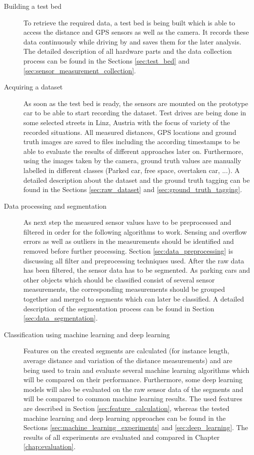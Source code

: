 \begin{description}

\item[Building a test bed] To retrieve the required data, a test bed is being built which is able to access the distance and GPS sensors as well as the camera. It records these data continuously while driving by and saves them for the later analysis. The detailed description of all hardware parts and the data collection process can be found in the Sections \ref{sec:test_bed} and \ref{sec:sensor_measurement_collection}.

\item[Acquiring a dataset] As soon as the test bed is ready, the sensors are mounted on the prototype car to be able to start recording the dataset. Test drives are being done in some selected streets in Linz, Austria with the focus of variety of the recorded situations. All measured distances, GPS locations and ground truth images are  saved to files including the according timestamps to be able to evaluate the results of different approaches later on. Furthermore, using the images taken by the camera, ground truth values are manually labelled in different classes (Parked car, free space, overtaken car, ...). A detailed description about the dataset and the ground truth tagging can be found in the Sections \ref{sec:raw_dataset} and \ref{sec:ground_truth_tagging}.

\item[Data processing and segmentation] As next step the measured sensor values have to be preprocessed and filtered in order for the following algorithms to work. Sensing and overflow errors as well as outliers in the measurements should be identified and removed before further processing. Section \ref{sec:data_preprocessing} is discussing all filter and preprocessing techniques used. After the raw data has been filtered, the sensor data has to be segmented. As parking cars and other objects which should be classified consist of several sensor measurements, the corresponding measurements should be grouped together and merged to segments which can later be classified. A detailed description of the segmentation process can be found in Section \ref{sec:data_segmentation}.

\item[Classification using machine learning and deep learning] Features on the created segments are calculated (for instance length, average distance and variation of the distance measurements) and are being used to train and evaluate several machine learning algorithms which will be compared on their performance. Furthermore, some deep learning models will also be evaluated on the raw sensor data of the segments and will be compared to common machine learning results. The used features are described in Section \ref{sec:feature_calculation}, whereas the tested machine learning and deep learning approaches can be found in the Sections \ref{sec:machine_learning_experiments} and \ref{sec:deep_learning}. The results of all experiments are evaluated and compared in Chapter \ref{chap:evaluation}.


\end{description}
